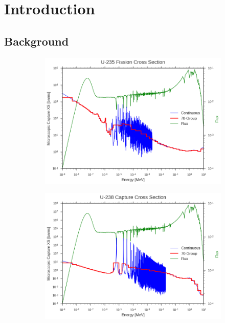 \chapter{Introduction}
\label{chap:intro}

\section{Background}
\label{sec:chap1-background}


\begin{figure}
\begin{subfigure}{.5\textwidth}
  \centering
  \includegraphics[width=\linewidth]{figures/intro/u235-fission-70}
  \caption{}
  \label{fig:assm-cells}
\end{subfigure}%
\begin{subfigure}{.5\textwidth}
  \centering
  \includegraphics[width=\linewidth]{figures/intro/u238-capture-70}

\end{subfigure}
\end{figure}
